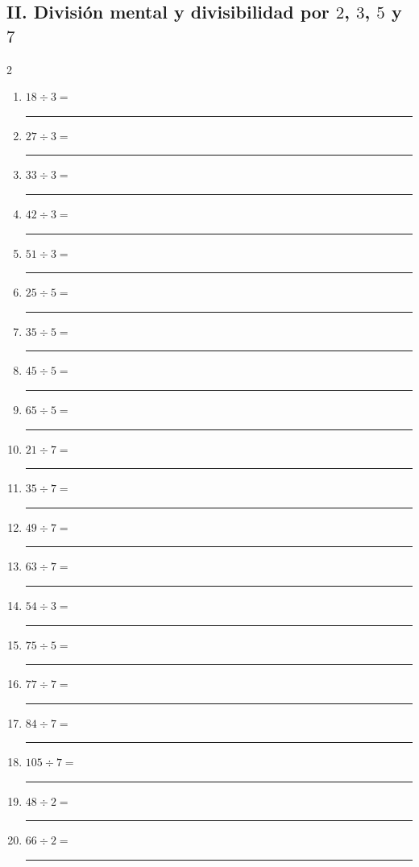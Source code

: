 \documentclass[11pt]{article}
\begin{document}
\subsection*{II. División mental y divisibilidad por $2$, $3$, $5$ y $7$}
\begin{multicols}{2}\begin{enumerate}[leftmargin=*,start=16]
\item $\displaystyle 18\div3=$ \rule{2.1cm}{0.4pt}
\item $\displaystyle 27\div3=$ \rule{2.1cm}{0.4pt}
\item $\displaystyle 33\div3=$ \rule{2.1cm}{0.4pt}
\item $\displaystyle 42\div3=$ \rule{2.1cm}{0.4pt}
\item $\displaystyle 51\div3=$ \rule{2.1cm}{0.4pt}
\item $\displaystyle 25\div5=$ \rule{2.1cm}{0.4pt}
\item $\displaystyle 35\div5=$ \rule{2.1cm}{0.4pt}
\item $\displaystyle 45\div5=$ \rule{2.1cm}{0.4pt}
\item $\displaystyle 65\div5=$ \rule{2.1cm}{0.4pt}
\item $\displaystyle 21\div7=$ \rule{2.1cm}{0.4pt}
\item $\displaystyle 35\div7=$ \rule{2.1cm}{0.4pt}
\item $\displaystyle 49\div7=$ \rule{2.1cm}{0.4pt}
\item $\displaystyle 63\div7=$ \rule{2.1cm}{0.4pt}
\item $\displaystyle 54\div3=$ \rule{2.1cm}{0.4pt}
\item $\displaystyle 75\div5=$ \rule{2.1cm}{0.4pt}
\item $\displaystyle 77\div7=$ \rule{2.1cm}{0.4pt}
\item $\displaystyle 84\div7=$ \rule{2.1cm}{0.4pt}
\item $\displaystyle 105\div7=$ \rule{2.1cm}{0.4pt}
\item $\displaystyle 48\div2=$ \rule{2.1cm}{0.4pt}
\item $\displaystyle 66\div2=$ \rule{2.1cm}{0.4pt}
\end{enumerate}\end{multicols}
\end{document}
